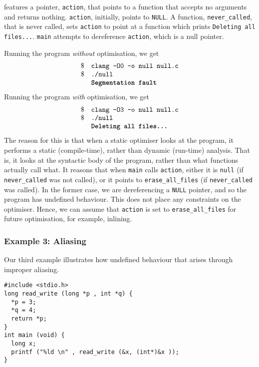  features a pointer, \texttt{action}, that points to a function that accepts no arguments and returns nothing. \texttt{action}, initially, points to \texttt{NULL}. A function, \texttt{never\_called}, that is never called, sets \texttt{action} to point at a function which prints \texttt{Deleting all files...}. \texttt{main} attempts to dereference \texttt{action}, which is a null pointer.

Running the program \textit{without} optimisation, we get
\[\begin{array}{ll}
    \$ & \texttt{clang -O0 -o null null.c} \\
    \$ & \texttt{./null} \\
       & \texttt{\textbf{Segmentation fault}}
\end{array}\]
Running the program \textit{with} optimisation, we get
\[\begin{array}{ll}
    \$ & \texttt{clang -O3 -o null null.c} \\
    \$ & \texttt{./null} \\
       & \texttt{\textbf{Deleting all files...}}
\end{array}\]
The reason for this is that when a static optimiser looks at the program, it performs a static (compile-time), rather than dynamic (run-time) analysis. That is, it looks at the syntactic body of the program, rather than what functions actually call what. It reasons that when \texttt{main} calls \texttt{action}, either it is \texttt{null} (if \texttt{never\_called} was not called), or it points to \texttt{erase\_all\_files} (if \texttt{never\_called} was called). In the former case, we are dereferencing a \texttt{NULL} pointer, and so the program has undefined behaviour. This does not place any constraints on the optimiser. Hence, we can assume that \texttt{action} is set to \texttt{erase\_all\_files} for future optimisation, for example, inlining. 

\subsubsection{Example 3: Aliasing}
Our third example illustrates how undefined behaviour that arises through improper aliasing. 

\begin{code}
\label{code:optimisation-al-overflow}
\begin{verbatim}
#include <stdio.h>
long read_write (long *p , int *q) {
  *p = 3;
  *q = 4;
  return *p;
}
int main (void) {
  long x;
  printf ("%ld \n" , read_write (&x, (int*)&x ));
}
\end{verbatim}
\end{code}

